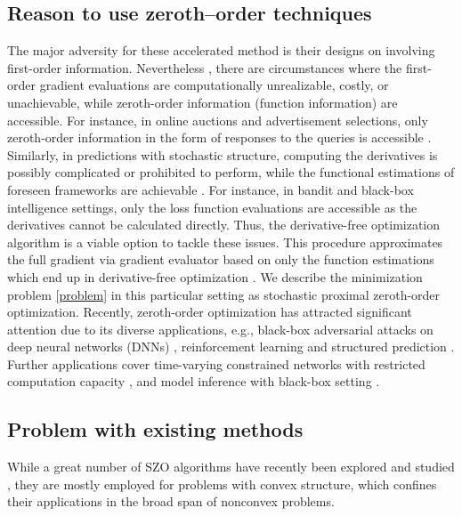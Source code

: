 \documentclass{article}
\theoremstyle{definition}
\theoremstyle{remark}
\begin{document}
\subsection{Reason to use zeroth--order techniques}
The major adversity for these accelerated method is their designs on involving first-order information. Nevertheless , there are circumstances where the first-order gradient evaluations are computationally unrealizable, costly, or unachievable, while zeroth-order information (function information) are accessible. For instance, in online auctions and advertisement
selections, only zeroth-order information in the form of responses to the queries is accessible \cite{wibisono2012finite}. Similarly, in predictions with stochastic structure, computing the derivatives is possibly complicated or prohibited to perform, while the functional estimations of foreseen frameworks are achievable  \cite{sokolov2016stochastic}. 
For instance, in bandit \cite{shamir2017optimal} and black-box intelligence \cite{chen2017zoo} settings, only the loss function evaluations are accessible as the derivatives cannot be calculated directly. 
Thus, the derivative-free  optimization algorithm \cite{nesterov2017random} is a viable option to tackle these issues. This procedure approximates the full gradient via gradient evaluator based on only the function estimations which end up in derivative-free optimization \cite{brent2013algorithms,spall2005introduction}. 
We describe the minimization problem \eqref{problem} in this particular setting as stochastic proximal zeroth-order optimization.
Recently, zeroth-order optimization has attracted significant attention due to its diverse applications, e.g., black-box adversarial attacks on deep neural networks (DNNs) \cite{kurakin2016adversarial,papernot2017practical, chen2017zoo}, reinforcement learning \cite{choromanski2018structured} and structured prediction \cite{taskar2005learning}.
Further applications cover time-varying constrained networks with restricted computation capacity \cite{chen2019bandit,liu2017zeroth}, and model inference with black-box setting \cite{fu2002optimization,lian2016comprehensive}. 

\subsection{Problem with existing methods}
While a great number of SZO algorithms have recently been explored and studied \cite{liu2017zeroth,flaxman2005online,shamir2013complexity,agarwal2010optimal,nesterov2017random,duchi2015optimal,shamir2017optimal,dvurechensky2018accelerated,wang2017stochastic}, they are mostly employed for problems with convex structure, which confines their applications in the broad span of nonconvex problems.
\end{document}
